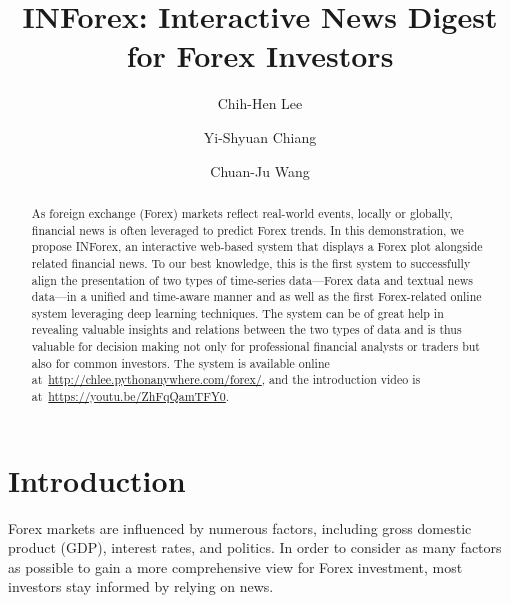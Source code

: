 \documentclass[runningheads]{llncs}
\begin{document}
%
\title{INForex: Interactive News Digest for Forex Investors}
%
%
\author{Chih-Hen Lee\and
Yi-Shyuan Chiang \and
Chuan-Ju Wang}
%
%
%
\maketitle              %
%
\vspace{-0.6cm}
\begin{abstract}
As foreign exchange (Forex) markets reflect real-world events, locally or globally, financial news is often leveraged to predict Forex trends. 
In this demonstration, we propose INForex, an interactive web-based system that displays a Forex plot alongside related financial news. To our best knowledge, this is the first system to successfully align the presentation of two types of time-series data---Forex data and textual news data---in a unified and time-aware manner and as well as the first Forex-related online system leveraging deep learning techniques. 
The system can be of great help in revealing valuable insights and relations between the two types of data and is thus valuable for decision making not only for professional financial analysts or traders but also for common investors.
The system is available online at~\url{http://chlee.pythonanywhere.com/forex/}, and the introduction video is at~\url{https://youtu.be/ZhFqQamTFY0}.

\end{abstract}
%
%
%
\vspace{-0.8cm}
\section{Introduction}
\vspace{-0.3cm}
Forex markets are influenced by numerous factors, including gross domestic product (GDP), interest rates, and politics.
In order to consider as many factors as possible to gain a more comprehensive view for Forex investment, most investors stay informed by relying on news.
\end{document}

